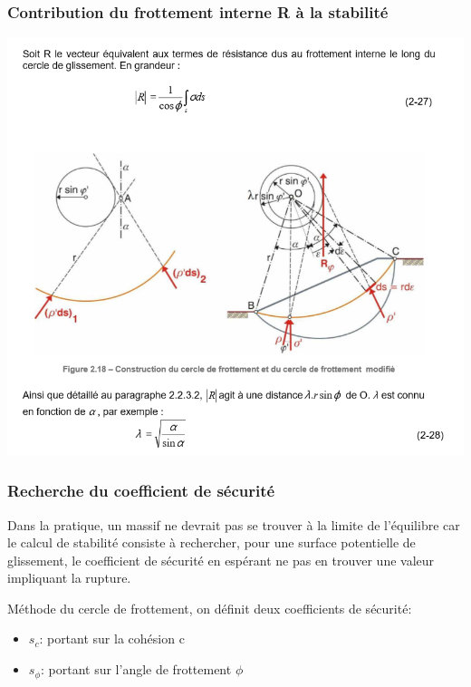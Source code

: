 \subsubsection{Contribution du frottement interne R à la stabilité}

\begin{center}
\includegraphics [scale=0.8]{pictures/t2.PNG}
\end{center}

\subsubsection{Recherche du coefficient de sécurité}

Dans la pratique, un massif ne devrait pas se trouver à la limite de l’équilibre car le calcul de stabilité consiste à rechercher, pour une surface potentielle de glissement, le coefficient de sécurité en espérant ne pas en trouver une valeur impliquant la rupture.

Méthode du cercle de frottement, on définit deux coefficients de sécurité:
\begin{itemize}
    \item $s_c$: portant sur la cohésion c
    \item $s_{\phi}$: portant sur l'angle de frottement $\phi$
\end{itemize}

\medskip

